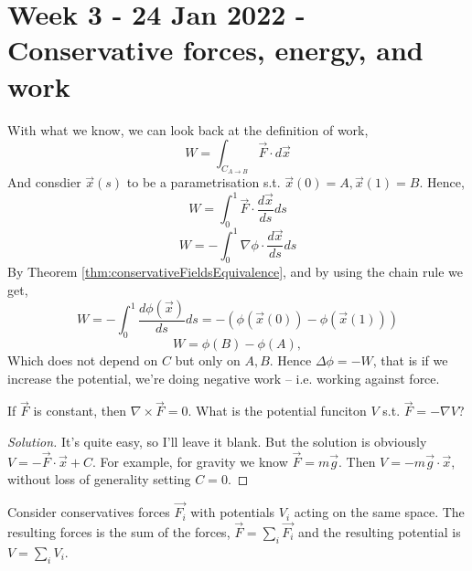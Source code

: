 \section{Week 3 - 24 Jan 2022 - Conservative forces, energy, and work}
With what we know, we can look back at the definition of work,
\[W=\int_{C_{A\to B}} \vec{F}\cdot d\vec{x}\]
And consdier $\vec{x}(s)$ to be a parametrisation s.t. $\vec{x}(0)=A,
\vec{x}(1)=B$. Hence,
\[W= \int_0^1 \vec{F}\cdot \frac{d\vec{x}}{ds}ds\]
\[W= -\int_0^1 \nabla \phi\cdot \frac{d\vec{x}}{ds}ds\]
By Theorem \ref{thm:conservativeFieldsEquivalence}, and by using the chain rule
we get,
\[W= -\int_0^1 \frac{d\phi(\vec{x})}{ds}ds= - (\phi(\vec{x}(0))-\phi(\vec{x}(1)))\]
\[W= \phi(B)-\phi(A),\]
Which does not depend on $C$ but only on $A,B$. Hence $\Delta\phi=-W$, that is
if we increase the potential, we're doing negative work -- i.e. working against
force.

\begin{example}
  If $\vec{F}$ is constant, then $\nabla \times \vec{F}=0$. What is the
  potential funciton $V$ s.t. $\vec{F}=-\nabla V$?
\end{example}
\begin{proof}[Solution]
  It's quite easy, so I'll leave it blank. But the solution is obviously
  $V=-\vec{F}\cdot\vec{x}+C$. For example, for gravity we know
  $\vec{F}=m\vec{g}$. Then $V=-m\vec{g}\cdot\vec{x}$, without loss of generality
  setting $C=0$.
\end{proof}

\begin{proposition}
  Consider conservatives forces $\vec{F_i}$ with potentials $V_i$ acting on the
  same space. The resulting forces is the sum of the forces, $\vec{F}=\sum_i
  \vec{F_i}$ and the resulting potential is $V=\sum_i V_i$.
\end{proposition}

